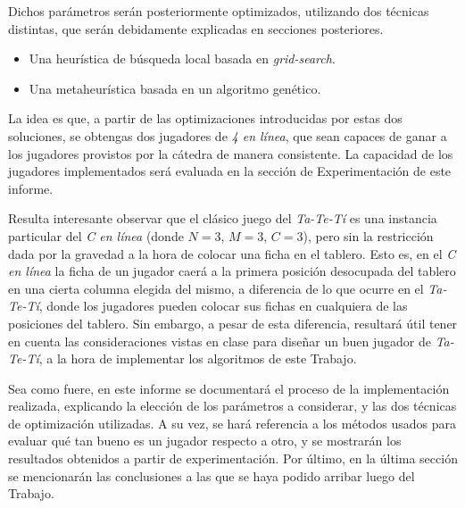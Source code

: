 \documentclass[12pt,a4paper]{article}
\begin{document}
    Dichos parámetros serán posteriormente optimizados, utilizando dos técnicas distintas, que serán debidamente explicadas en secciones posteriores.
    \begin{itemize}
        \item Una heurística de búsqueda local basada en \textit{grid-search}.
        \item Una metaheurística basada en un algoritmo genético.
    \end{itemize}
    
    La idea es que, a partir de las optimizaciones introducidas por estas dos soluciones, se obtengas dos jugadores de \textit{4 en línea}, que sean capaces de ganar a los jugadores provistos por la cátedra de manera consistente. La capacidad de los jugadores implementados será evaluada en la sección de Experimentación de este informe.
    
    Resulta interesante observar que el clásico juego del \textit{Ta-Te-Tí} es una instancia particular del \textit{C en línea} (donde $N = 3$, $M = 3$, $C = 3$), pero sin la restricción dada por la gravedad a la hora de colocar una ficha en el tablero. Esto es, en el \textit{C en línea} la ficha de un jugador caerá a la primera posición desocupada del tablero en una cierta columna elegida del mismo, a diferencia de lo que ocurre en el \textit{Ta-Te-Tí}, donde los jugadores pueden colocar sus fichas en cualquiera de las posiciones del tablero. Sin embargo, a pesar de esta diferencia, resultará útil tener en cuenta las consideraciones vistas en clase para diseñar un buen jugador de \textit{Ta-Te-Tí}, a la hora de implementar los algoritmos de este Trabajo.
    
    Sea como fuere, en este informe se documentará el proceso de la implementación realizada, explicando la elección de los parámetros a considerar, y las dos técnicas de optimización utilizadas. A su vez, se hará referencia a los métodos usados para evaluar qué tan bueno es un jugador respecto a otro, y se mostrarán los resultados obtenidos a partir de experimentación. Por último, en la última sección se mencionarán las conclusiones a las que se haya podido arribar luego del Trabajo.
    
    
\end{document}
